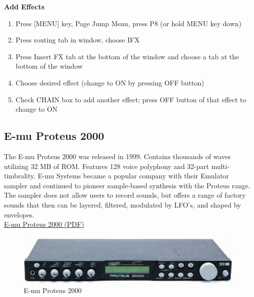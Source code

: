 \documentclass{tufte-book} %
\begin{document}
\textbf{Add Effects}
\begin{enumerate}
	\item Press [MENU] key, Page Jump Menu, press P8 (or hold MENU key down)
	\item Press routing tab in window, choose IFX
	\item Press Insert FX tab at the bottom of the window and choose a tab at the bottom of the window
	\item Choose desired effect (change to ON by pressing OFF button)
	\item Check CHAIN box to add another effect; press OFF button of that effect to change to ON
\end{enumerate}

\newpage

\newpage
\subsection{E-mu Proteus 2000}

\begin{fullwidth}
	The E-mu Proteus 2000 was released in 1999. Contains thousands of waves utilizing 32 MB of ROM. Features 128 voice polyphony and 32-part multi-timbrality. E-mu Systems became a popular company with their Emulator sampler and continued to pioneer sample-based synthesis with the Proteus range. The sampler does not allow users to record sounds, but offers a range of factory sounds that then can be layered, filtered, modulated by LFO's, and shaped by envelopes. \\
\linebreak
\href{https://github.com/dkadyrov/MIDILab/blob/master/Manuals/EMU_Proteus2000.pdf}{E-mu Proteus 2000 (PDF)}
\end{fullwidth}

\begin{figure}[h]
\centering
\includegraphics[width=.85\textwidth]{LaTeX/e-mu-proteus-2000}
\caption{E-mu Proteus 2000}
\label{fig:fullfig}
\end{figure}
\end{document}
